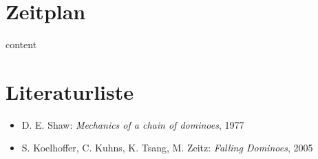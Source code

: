 \documentclass[11pt,a4paper]{scrartcl}
\begin{document}
\section{Zeitplan}
content \\

\section{Literaturliste}
\begin{itemize}
	\item D. E. Shaw: \emph{Mechanics of a chain of dominoes}, 1977
	\item S. Koelhoffer, C. Kuhns, K. Tsang, M. Zeitz: \emph{Falling Dominoes}, 2005 \\
\end{itemize}
\end{document}
